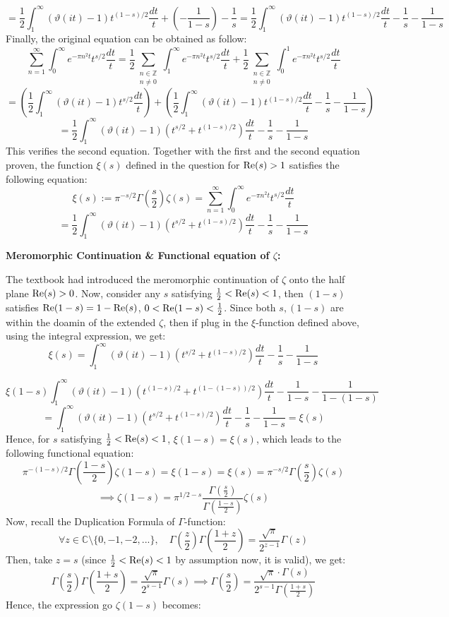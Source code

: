 \documentclass{article}
\begin{document}
$$ = \frac{1}{2}\int_{1}^{\infty}(\vartheta(it)-1)t^{(1-s)/2}\frac{dt}{t}+\left(-\frac{1}{1-s}\right) - \frac{1}{s} = \frac{1}{2}\int_{1}^{\infty}(\vartheta(it)-1)t^{(1-s)/2}\frac{dt}{t} - \frac{1}{s}-\frac{1}{1-s}$$
Finally, the original equation can be obtained as follow:
$$\sum_{n=1}^{\infty}\int_{0}^{\infty}e^{-\pi n^2t}t^{s/2}\frac{dt}{t} = \frac{1}{2}\sum_{\substack{n\in\mathbb{Z}\\n\neq 0}}\int_{1}^{\infty}e^{-\pi n^2t}t^{s/2}\frac{dt}{t}+\frac{1}{2}\sum_{\substack{n\in\mathbb{Z}\\n\neq 0}}\int_{0}^{1}e^{-\pi n^2t}t^{s/2}\frac{dt}{t}$$
$$ = \left(\frac{1}{2}\int_{1}^{\infty}(\vartheta(it)-1)t^{s/2}\frac{dt}{t}\right)+\left(\frac{1}{2}\int_{1}^{\infty}(\vartheta(it)-1)t^{(1-s)/2}\frac{dt}{t} - \frac{1}{s}-\frac{1}{1-s}\right)$$
$$ = \frac{1}{2}\int_{1}^{\infty}(\vartheta(it)-1)(t^{s/2}+t^{(1-s)/2})\frac{dt}{t}-\frac{1}{s}-\frac{1}{1-s}$$
This verifies the second equation. Together with the first and the second equation proven, the function $\xi(s)$ defined in the question for $\textmd{Re}(s)>1$ satisfies the following equation:
$$\xi(s):=\pi ^{-s/2}\Gamma\left(\frac{s}{2}\right)\zeta(s)=\sum_{n=1}^{\infty}\int_{0}^{\infty}e^{-\pi n^2t}t^{s/2}\frac{dt}{t}$$
$$=\frac{1}{2}\int_{1}^{\infty}(\vartheta(it)-1)(t^{s/2}+t^{(1-s)/2})\frac{dt}{t}-\frac{1}{s}-\frac{1}{1-s}$$

\hfil

\textbf{Meromorphic Continuation \& Functional equation of $\zeta$:}

The textbook had introduced the meromorphic continuation of $\zeta$ onto the half plane $\textmd{Re}(s)>0$. Now, consider any $s$ satisfying $\frac{1}{2}<\textmd{Re}(s)<1$, then $(1-s)$ satisfies $\textmd{Re}(1-s)=1-\textmd{Re}(s)$, $0<\textmd{Re}(1-s)<\frac{1}{2}$. Since both $s,(1-s)$ are within the doamin of the extended $\zeta$, then if plug in the $\xi$-function defined above, using the integral expression, we get:
$$\xi(s) = \int_{1}^{\infty}(\vartheta(it)-1)(t^{s/2}+t^{(1-s)/2})\frac{dt}{t}-\frac{1}{s}-\frac{1}{1-s}$$

$$\xi(1-s)\int_{1}^{\infty}(\vartheta(it)-1)(t^{(1-s)/2}+t^{(1-(1-s))/2})\frac{dt}{t}-\frac{1}{1-s}-\frac{1}{1-(1-s)}$$
$$ = \int_{1}^{\infty}(\vartheta(it)-1)(t^{s/2}+t^{(1-s)/2})\frac{dt}{t}-\frac{1}{s}-\frac{1}{1-s} = \xi(s)$$
Hence, for $s$ satisfying $\frac{1}{2}<\textmd{Re}(s)<1$, $\xi(1-s)=\xi(s)$, which leads to the following functional equation:
$$\pi^{-(1-s)/2}\Gamma\left(\frac{1-s}{2}\right)\zeta(1-s)=\xi(1-s)=\xi(s)=\pi^{-s/2}\Gamma\left(\frac{s}{2}\right)\zeta(s)$$
$$\implies \zeta(1-s) = \pi ^{1/2-s}\frac{\Gamma\left(\frac{s}{2}\right)}{\Gamma\left(\frac{1-s}{2}\right)}\zeta(s)$$
Now, recall the Duplication Formula of $\Gamma$-function:
$$\forall z\in \mathbb{C}\setminus\{0,-1,-2,...\},\quad \Gamma\left(\frac{z}{2}\right)\Gamma\left(\frac{1+z}{2}\right)=\frac{\sqrt{\pi}}{2^{z-1}}\Gamma(z)$$
Then, take $z=s$ (since $\frac{1}{2}<\textmd{Re}(s)<1$ by assumption now, it is valid), we get:
$$\Gamma\left(\frac{s}{2}\right)\Gamma\left(\frac{1+s}{2}\right)=\frac{\sqrt{\pi}}{2^{s-1}}\Gamma(s)\implies \Gamma\left(\frac{s}{2}\right)=\frac{\sqrt{\pi }\cdot\Gamma(s)}{2^{s-1}\Gamma\left(\frac{1+s}{2}\right)}$$
Hence, the expression go $\zeta(1-s)$ becomes:
\end{document}
